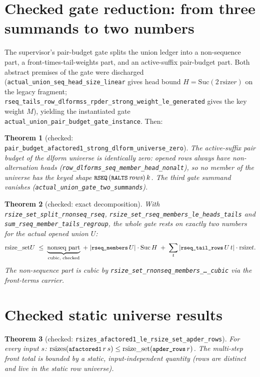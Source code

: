 \documentclass[11pt]{article}
\newtheorem{theorem}{Theorem}[section]
\newcommand{\rsize}{\mathrm{rsize}}
\newcommand{\rsizes}{\mathrm{rsizes}}
\newcommand{\rsizeset}{\mathrm{rsize\_set}}
\newcommand{\code}[1]{\texttt{\small #1}}
\begin{document}
\section{Checked gate reduction: from three summands to two numbers}

The supervisor's pair-budget gate splits the union ledger into a non-sequence
part, a front-times-tail-weights part, and an active-suffix pair-budget part.
Both abstract premises of the gate were discharged
(\code{actual\_union\_seq\_head\_size\_linear} gives head bound
$H = \mathrm{Suc}(2\,\rsize r)$ on the legacy fragment;
\code{rseq\_tails\_row\_dlformss\_rpder\_strong\_weight\_le\_generated} gives
the key weight $M$), yielding the instantiated gate
\code{actual\_union\_pair\_budget\_gate\_instance}.  Then:

\begin{theorem}[checked: \code{pair\_budget\_afactored1\_strong\_dlform\_universe\_zero}]
The active-suffix pair budget of the dlform universe is identically zero:
opened rows always have non-alternation heads
(\code{row\_dlforms\_seq\_member\_head\_nonalt}), so no member of the
universe has the keyed shape $\code{RSEQ}\,(\code{RALTS}\,\textit{rows})\,k$.
The third gate summand vanishes
(\code{actual\_union\_gate\_two\_summands}).
\end{theorem}

\begin{theorem}[checked: exact decomposition]
With \code{rsize\_set\_split\_rnonseq\_rseq},
\code{rsize\_set\_rseq\_members\_le\_heads\_tails} and
\code{sum\_rseq\_member\_tails\_regroup}, the whole gate rests on exactly two
numbers for the actual opened union $U$:
\[
\rsizeset U \;\le\; \underbrace{\text{nonseq part}}_{\text{cubic, checked}}
\;+\; |{\code{rseq\_members}\,U}| \cdot \mathrm{Suc}\,H
\;+\; \sum_{t} |\code{rseq\_tail\_rows}\,U\,t| \cdot \rsize t .
\]
The non-sequence part is cubic by
\code{rsize\_set\_rnonseq\_members\_\dots\_cubic} via the front-terms carrier.
\end{theorem}

\section{Checked static universe results}

\begin{theorem}[checked: \code{rsizes\_afactored1\_le\_rsize\_set\_apder\_rows}]
For \emph{every} input $s$:
$\rsizes(\code{afactored1}\,r\,s) \le \rsizeset(\code{apder\_rows}\,r)$.
The multi-step front total is bounded by a static, input-independent
quantity (rows are distinct and live in the static row universe).
\end{theorem}
\end{document}
